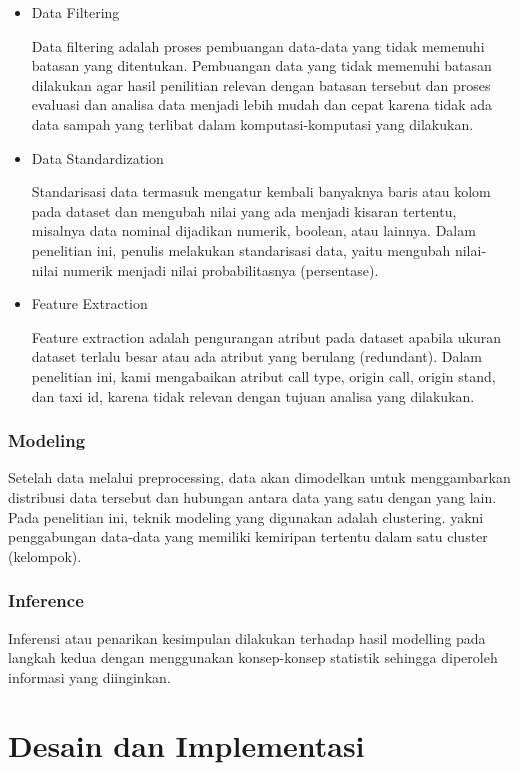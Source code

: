 \documentclass{article}
\begin{document}
\begin{itemize}
	\item{Data Filtering}
		
		Data filtering adalah proses pembuangan data-data yang tidak memenuhi batasan yang ditentukan. Pembuangan data yang tidak memenuhi batasan dilakukan agar hasil penilitian relevan dengan batasan tersebut dan proses evaluasi dan analisa data menjadi lebih mudah dan cepat karena tidak ada data sampah yang terlibat dalam komputasi-komputasi yang dilakukan.
		
	\item{Data Standardization}
		
		Standarisasi data termasuk mengatur kembali banyaknya baris atau kolom pada dataset dan mengubah nilai yang ada menjadi kisaran tertentu, misalnya data nominal dijadikan numerik, boolean, atau lainnya. Dalam penelitian ini, penulis melakukan standarisasi data, yaitu mengubah nilai-nilai numerik menjadi nilai probabilitasnya (persentase).
		
	\item{Feature Extraction}
		
		Feature extraction adalah pengurangan atribut pada dataset apabila ukuran dataset terlalu besar atau ada atribut yang berulang (redundant). Dalam penelitian ini, kami mengabaikan atribut call type, origin call, origin stand, dan taxi id, karena tidak relevan dengan tujuan analisa yang dilakukan.
		
\end{itemize}

\subsubsection{Modeling}

Setelah data melalui preprocessing, data akan dimodelkan untuk menggambarkan distribusi data tersebut dan hubungan antara data yang satu dengan yang lain. Pada penelitian ini, teknik modeling yang digunakan adalah clustering. yakni penggabungan data-data yang memiliki kemiripan tertentu dalam satu cluster (kelompok).

\subsubsection{Inference}

Inferensi atau penarikan kesimpulan dilakukan terhadap hasil modelling pada langkah kedua dengan menggunakan konsep-konsep statistik sehingga diperoleh informasi yang diinginkan.

\section{Desain dan Implementasi}
\end{document}
